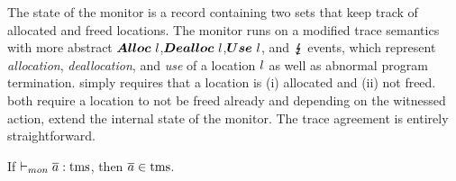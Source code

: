\documentclass[utf8,acmsmall,review,screen,dvipsnames]{acmart}
\begin{document}
\begin{center}
  $\;$\\
\end{center}

The state of the monitor is a record containing two sets that keep track of allocated and freed locations.
The monitor runs on a modified trace semantics with more abstract $\bm{Alloc\ }l$,$\bm{Dealloc\ }l$,$\bm{Use\ }l$, and $\lightning{\kern-5.5pt}\lightning$ events, which represent {\em allocation}, {\em deallocation}, and {\em use} of a location $l$ as well as abnormal program termination.
 simply requires that a location is (i) allocated and (ii) not freed.
 both require a location to not be freed already and depending on the witnessed action, extend the internal state of the monitor.
The trace agreement is entirely straightforward.

\begin{lemma}\label{lem:mon:tmsafe}
  If $\vdash_{mon}{\overline{a}}:{\operatorname{tms}}$, then $\overline{a}\in\operatorname{tms}$.\Coqed
\end{lemma}
\end{document}
